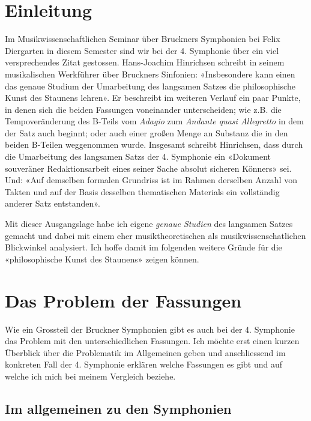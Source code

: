\section{Einleitung}

Im Musikwissenschaftlichen Seminar über Bruckners Symphonien bei Felix Diergarten in diesem Semester sind wir bei der 4. Symphonie über ein viel versprechendes Zitat gestossen.
Hans-Joachim Hinrichsen schreibt in seinem musikalischen Werkführer über Bruckners Sinfonien: «Insbesondere kann einen das genaue Studium der Umarbeitung des langsamen Satzes die philosophische Kunst des Staunens lehren»\autocite[76]{hinrichsen:bruckner}.
Er beschreibt im weiteren Verlauf ein paar Punkte, in denen sich die beiden Fassungen voneinander unterscheiden; wie z.B. die Tempoveränderung des B-Teils vom \emph{Adagio} zum \emph{Andante quasi Allegretto} in dem der Satz auch beginnt; oder auch einer großen Menge an Substanz die in den beiden B-Teilen weggenommen wurde.
Insgesamt schreibt Hinrichsen, dass durch die Umarbeitung des langsamen Satzs der 4. Symphonie ein «Dokument souveräner Redaktionsarbeit eines seiner Sache absolut sicheren Könners»\autocite[77]{hinrichsen:bruckner} sei.
Und: «Auf demselben formalen Grundriss ist im Rahmen derselben Anzahl von Takten und auf der Basis desselben thematischen Materials ein vollständig anderer Satz entstanden»\autocite[77]{hinrichsen:bruckner}.

Mit dieser Ausgangslage habe ich eigene \emph{genaue Studien} des langsamen Satzes gemacht und dabei mit einem eher musiktheoretischen als musikwissenschatlichen Blickwinkel analysiert.
Ich hoffe damit im folgenden weitere Gründe für die «philosophische Kunst des Staunens» zeigen können.



\section{Das Problem der Fassungen}

Wie ein Grossteil der Bruckner Symphonien gibt es auch bei der 4. Symphonie das Problem mit den unterschiedlichen Fassungen.
Ich möchte erst einen kurzen Überblick über die Problematik im Allgemeinen geben und anschliessend im konkreten Fall der 4. Symphonie erklären welche Fassungen es gibt und auf welche ich mich bei meinem Vergleich beziehe.


\subsection{Im allgemeinen zu den Symphonien}


